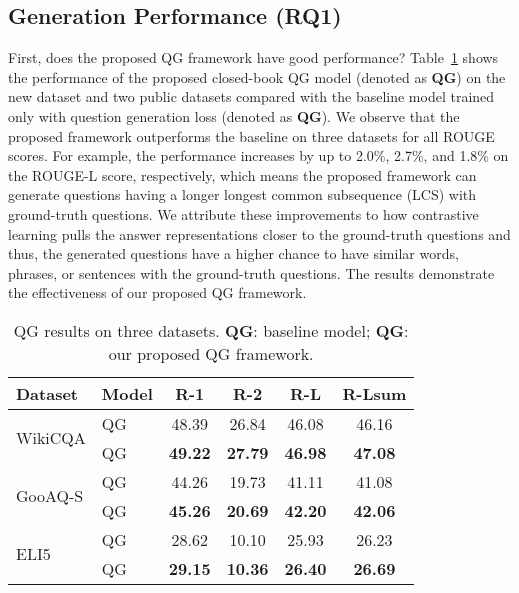 \documentclass[11pt]{article}
\begin{document}
\subsection{Generation Performance (RQ1)}
First, does the proposed QG framework have good performance? Table~\ref{tab:qg-results} shows the performance of the proposed closed-book QG model (denoted as \textbf{QG}) on the new dataset and two public datasets compared with the baseline model trained only with question generation loss (denoted as \textbf{QG}). 
We observe that the proposed framework outperforms the baseline on three datasets for all ROUGE scores. For example, the performance increases by up to 2.0\%, 2.7\%, and 1.8\% on the ROUGE-L score, respectively, which means the proposed framework can generate questions having a longer longest common subsequence (LCS) with ground-truth questions. We attribute these improvements to how contrastive learning pulls the answer representations closer to the ground-truth questions and thus, the generated questions have a higher chance to have similar words, phrases, or sentences with the ground-truth questions. The results demonstrate the effectiveness of our proposed QG framework.

\begin{table}[htbp!]
\centering\small
\begin{tabular}{p{1cm}p{0.8cm}cccc}
\hline
\textbf{Dataset} & \textbf{Model} & \textbf{R-1} & \textbf{R-2} & \textbf{R-L} & \textbf{R-Lsum} \\
\hline
\multirow{2}{*}{WikiCQA} & QG & 48.39 & 26.84 & 46.08 & 46.16  \\
                         & QG & \textbf{49.22} & \textbf{27.79} & \textbf{46.98} & \textbf{47.08} \\\hline
\multirow{2}{*}{GooAQ-S} & QG & 44.26 & 19.73 & 41.11 & 41.08 \\
                       & QG & \textbf{45.26} & \textbf{20.69} & \textbf{42.20} & \textbf{42.06} \\\hline
\multirow{2}{*}{ELI5} & QG & 28.62 & 10.10 & 25.93 & 26.23 \\
                      & QG & \textbf{29.15} & \textbf{10.36} & \textbf{26.40} & \textbf{26.69} \\
\hline
\end{tabular}
\caption{QG results on three datasets. \textbf{QG}: baseline model; \textbf{QG}: our proposed QG framework.}
\label{tab:qg-results}
\end{table}
\end{document}
